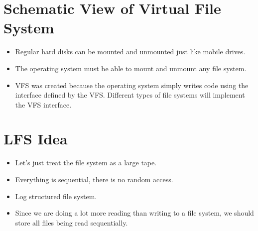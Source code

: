 \documentclass[]{article}
\begin{document}
\section{Schematic View of Virtual File System}
\begin{itemize}
\item Regular hard disks can be mounted and unmounted just like mobile drives.
\item The operating system must be able to mount and unmount any file system.
\item VFS was created because the operating system simply writes code using the
interface defined by the VFS. Different types of file systems will implement the
VFS interface.
\end{itemize}

\section{LFS Idea}
\begin{itemize}
\item Let's just treat the file system as a large tape.
\item Everything is sequential, there is no random access.
\item Log structured file system.
\item Since we are doing a lot more reading than writing to a file system, we
should store all files being read sequentially.
\end{itemize}
\end{document}
